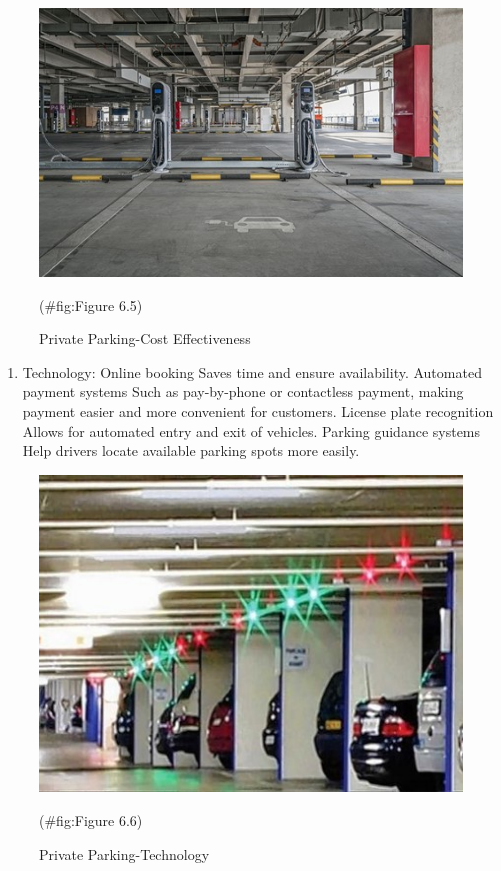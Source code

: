 \documentclass[
]{book}
\providecommand{\tightlist}{%
  \setlength{\itemsep}{0pt}\setlength{\parskip}{0pt}}
\begin{document}
\begin{figure}

{\centering \includegraphics{./Images/Parking/Private Parking-Cost Effectiveness} 

}

\caption{Private Parking-Cost Effectiveness}(\#fig:Figure 6.5)
\end{figure}

\begin{enumerate}
\def\labelenumi{\arabic{enumi}.}
\setcounter{enumi}{4}
\tightlist
\item
  Technology:
  Online booking
  Saves time and ensure availability.
  Automated payment systems
  Such as pay-by-phone or contactless payment, making payment easier and more convenient for customers.
  License plate recognition
  Allows for automated entry and exit of vehicles.
  Parking guidance systems
  Help drivers locate available parking spots more easily.
\end{enumerate}

\begin{figure}

{\centering \includegraphics{./Images/Parking/Private Parking-Technology} 

}

\caption{Private Parking-Technology}(\#fig:Figure 6.6)
\end{figure}
\end{document}
